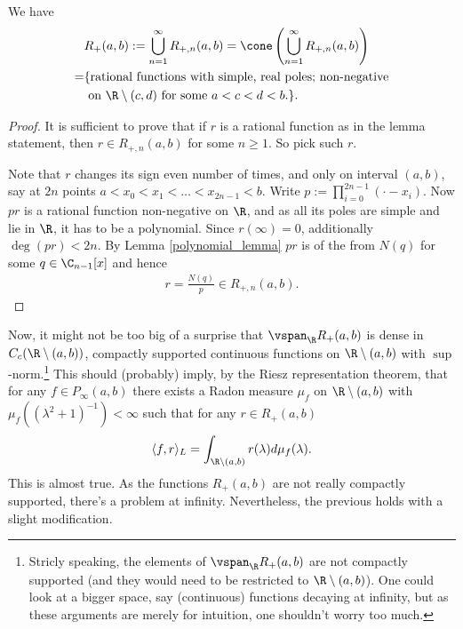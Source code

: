 \begin{lem}
	We have
	\begin{align*}
		&R_{+}(a, b) := \bigcup_{n = 1}^{\infty} R_{+, n}(a, b) = \cone\left( \bigcup_{n = 1}^{\infty} R_{+, n}(a, b)\right) \\
		= &\{ \text{rational functions with simple, real poles; non-negative} \\
		& \text{ on $\R \setminus (c, d)$ for some $a < c < d < b$.} \}.
	\end{align*}
\end{lem}
\begin{proof}
	It is sufficient to prove that if $r$ is a rational function as in the lemma statement, then $r \in R_{+, n}(a, b)$ for some $n \geq 1$. So pick such $r$.

	Note that $r$ changes its sign even number of times, and only on interval $(a, b)$, say at $2 n$ points $a < x_{0} < x_{1} < \ldots < x_{2 n - 1} < b$. Write $p := \prod_{i = 0}^{2 n - 1} (\cdot - x_{i})$. Now $pr$ is a rational function non-negative on $\R$, and as all its poles are simple and lie in $\R$, it has to be a polynomial. Since $r(\infty) = 0$, additionally $\deg(p r) < 2 n$. By Lemma \ref{polynomial_lemma} $pr$ is of the from $N(q)$ for some $q \in \C_{n - 1}[x]$ and hence
	\begin{align*}
		r = \frac{N(q)}{p} \in R_{+, n}(a, b).
	\end{align*}
\end{proof}

Now, it might not be too big of a surprise that $\vspan_{\R} R_{+}(a, b)$ is dense in $C_{c}(\R \setminus (a, b))$, compactly supported continuous functions on $\R \setminus (a, b)$ with $\sup$-norm.\footnote{Stricly speaking, the elements of $\vspan_{\R} R_{+}(a, b)$ are not compactly supported (and they would need to be restricted to $\R \setminus (a, b)$). One could look at a bigger space, say (continuous) functions decaying at infinity, but as these arguments are merely for intuition, one shouldn't worry too much.} This should (probably) imply, by the Riesz representation theorem, that for any $f \in P_{\infty}(a, b)$ there exists a Radon measure $\mu_{f}$ on $\R \setminus (a, b)$ with $\mu_{f}((\lambda^2 + 1)^{-1}) < \infty$ such that for any $r \in R_{+}(a, b)$
\begin{align*}
	\langle f, r \rangle_{L} = \int_{\R \setminus (a, b)} r(\lambda) d \mu_{f}(\lambda).
\end{align*}
This is almost true. As the functions $R_{+}(a, b)$ are not really compactly supported, there's a problem at infinity.  Nevertheless, the previous holds with a slight modification.

